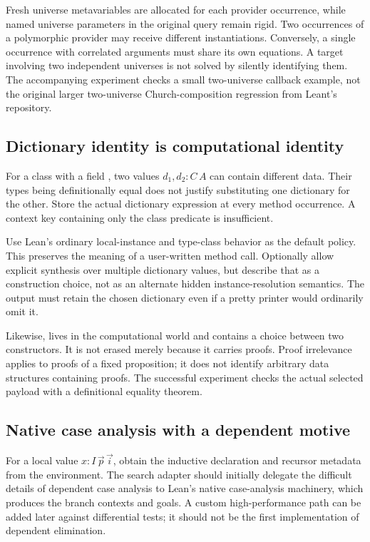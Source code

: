 Fresh universe metavariables are allocated for each provider occurrence, while named universe parameters in the original query remain rigid. Two occurrences of a polymorphic provider may receive different instantiations. Conversely, a single occurrence with correlated arguments must share its own equations. A target involving two independent universes is not solved by silently identifying them. The accompanying experiment checks a small two-universe callback example, not the original larger two-universe Church-composition regression from Leant's repository.

\subsection{Dictionary identity is computational identity}
For a class with a field , two values $d_1,d_2:C\,A$ can contain different data. Their types being definitionally equal does not justify substituting one dictionary for the other. Store the actual dictionary expression at every method occurrence. A context key containing only the class predicate is insufficient.

Use Lean's ordinary local-instance and type-class behavior as the default policy. This preserves the meaning of a user-written method call. Optionally allow explicit synthesis over multiple dictionary values, but describe that as a construction choice, not as an alternate hidden instance-resolution semantics. The output must retain the chosen dictionary even if a pretty printer would ordinarily omit it.

Likewise,  lives in the computational world and contains a choice between two constructors. It is not erased merely because it carries proofs. Proof irrelevance applies to proofs of a fixed proposition; it does not identify arbitrary data structures containing proofs. The successful  experiment checks the actual selected payload with a definitional equality theorem.

\subsection{Native case analysis with a dependent motive}
For a local value $x:I\,\vec p\,\vec i$, obtain the inductive declaration and recursor metadata from the environment. The search adapter should initially delegate the difficult details of dependent case analysis to Lean's native case-analysis machinery, which produces the branch contexts and goals. A custom high-performance path can be added later against differential tests; it should not be the first implementation of dependent elimination.\cite{inductives}


